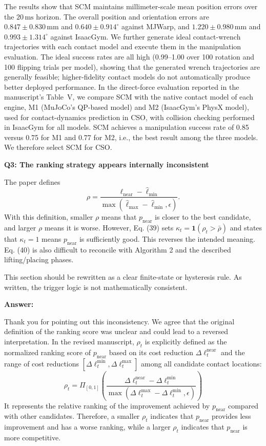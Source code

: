 \documentclass[journal,10pt]{IEEEtran}
\newcommand{\question}[2]{\par\smallskip\noindent
 \color{responseblue}\textbf{Q#1: #2}\par\nobreak\noindent\color{responseblue}}
\newcommand{\answer}{\par\smallskip\noindent\color{black}\textbf{Answer: }\ignorespaces
}
\begin{document}
\endgroup
The results show that SCM maintains millimeter-scale mean position errors over the $20\,\mathrm{ms}$ horizon. The overall position and orientation errors are $0.847\pm0.830\,\mathrm{mm}$ and $0.640\pm0.914^{\circ}$ against MJWarp, and $1.220\pm0.980\,\mathrm{mm}$ and $0.993\pm1.314^{\circ}$ against IsaacGym. We further generate ideal contact-wrench trajectories with each contact model and execute them in the manipulation evaluation. The ideal success rates are all high (0.99--1.00 over 100 rotation and 100 flipping trials per model), showing that the generated wrench trajectories are generally feasible; higher-fidelity contact models do not automatically produce better deployed performance. In the direct-force evaluation reported in the manuscript's Table~V, we compare SCM with the native contact model of each engine, M1 (MuJoCo's QP-based model) and M2 (IsaacGym's PhysX model), used for contact-dynamics prediction in CSO, with collision checking performed in IsaacGym for all models. SCM achieves a manipulation success rate of 0.85 versus 0.75 for M1 and 0.77 for M2, i.e., the best result among the three models. We therefore select SCM for CSO.

\question{3}{The ranking strategy appears internally inconsistent}

The paper defines
\begin{equation}
 \rho=\frac{\ell_{\text{near}}-\hat{\ell}_{\text{min}}}{\max(\hat{\ell}_{\text{max}}-\hat{\ell}_{\text{min}},\epsilon)}.
\end{equation}
With this definition, smaller $\rho$ means that $p_{\text{near}}$ is closer to the best candidate, and larger $\rho$ means it is worse. However, Eq. (39) sets $\kappa_t=\mathbf{1}(\rho_t>\bar{\rho})$ and states that $\kappa_t=1$ means $p_{\text{near}}$ is sufficiently good. This reverses the intended meaning. Eq. (40) is also difficult to reconcile with Algorithm 2 and the described lifting/placing phases.

This section should be rewritten as a clear finite-state or hysteresis rule. As written, the trigger logic is not mathematically consistent.

\answer
Thank you for pointing out this inconsistency. We agree that the original definition of the ranking score was unclear and could lead to a reversed interpretation. In the revised manuscript, $\rho_t$ is explicitly defined as the normalized ranking score of $p_{\mathrm{near}}$ based on its cost reduction $\Delta \ell_t^{\mathrm{near}}$ and the range of cost reductions $[\Delta \ell_t^{\mathrm{min}},\Delta \ell_t^{\mathrm{max}}]$ among all candidate contact locations:
\begin{equation}\label{equ:ranking1}
\rho_t=
\Pi_{[0,1]}\!\left(
\frac{
\Delta\ell_t^{\mathrm{near}}
-\Delta\ell_t^{\mathrm{min}}
}{\max(
\Delta\ell_t^{\mathrm{max}}
-\Delta\ell_t^{\mathrm{min}}, \epsilon)
}
\right)
\end{equation}
It represents the relative ranking of the improvement achieved by $p_{\mathrm{near}}$ compared with other candidates. Therefore, a smaller $\rho_t$ indicates that $p_{\mathrm{near}}$ provides less improvement and has a worse ranking, while a larger $\rho_t$ indicates that $p_{\mathrm{near}}$ is more competitive.
\end{document}
